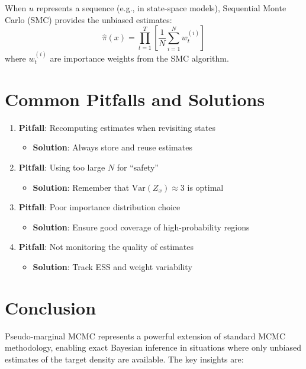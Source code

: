 \documentclass[11pt]{article}
\theoremstyle{definition}
\begin{document}
When $u$ represents a sequence (e.g., in state-space models), Sequential Monte Carlo (SMC) provides the unbiased estimates:
\begin{equation}
\hat{\pi}(x) = \prod_{t=1}^{T} \left[\frac{1}{N}\sum_{i=1}^{N} w_t^{(i)}\right]
\end{equation}
where $w_t^{(i)}$ are importance weights from the SMC algorithm.

\section{Common Pitfalls and Solutions}

\begin{enumerate}
\item \textbf{Pitfall}: Recomputing estimates when revisiting states
    \begin{itemize}
    \item \textbf{Solution}: Always store and reuse estimates
    \end{itemize}
    
\item \textbf{Pitfall}: Using too large $N$ for ``safety''
    \begin{itemize}
    \item \textbf{Solution}: Remember that $\text{Var}(Z_x) \approx 3$ is optimal
    \end{itemize}
    
\item \textbf{Pitfall}: Poor importance distribution choice
    \begin{itemize}
    \item \textbf{Solution}: Ensure good coverage of high-probability regions
    \end{itemize}
    
\item \textbf{Pitfall}: Not monitoring the quality of estimates
    \begin{itemize}
    \item \textbf{Solution}: Track ESS and weight variability
    \end{itemize}
\end{enumerate}

\section{Conclusion}

Pseudo-marginal MCMC represents a powerful extension of standard MCMC methodology, enabling exact Bayesian inference in situations where only unbiased estimates of the target density are available. The key insights are:
\end{document}
